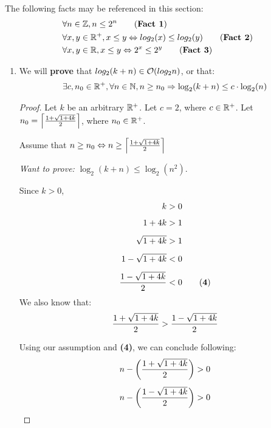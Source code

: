 \documentclass[12pt]{article}
\theoremstyle{definition}
\begin{document}
The following facts may be referenced in this section:
\begin{align*}
    &\forall n \in \Z, n \leq 2^n \tag{\textbf{Fact 1}}\\
    &\forall x, y \in \R^+, x \leq y \iff log_2(x) \leq log_2(y) \tag{\textbf{Fact 2}}\\
    &\forall x, y \in \R, x \leq y \iff 2^x \leq 2^y \tag{\textbf{Fact 3}}
\end{align*}

\begin{enumerate}

    \item We will \textbf{prove} that $log_2(k+n) \in \mathcal O(log_2 n)$, or that:
    \begin{align*}
        \exists c, n_0 \in \mathbb R^+, \forall n \in \mathbb N, n \geq n_0 \mathrel{\Rightarrow} \log_2(k+n) \leq c \cdot \log_2(n)
    \end{align*}
        \begin{proof}
            Let $k$ be an arbitrary $\mathbb R^+$. 
            Let $c = 2$, where $c \in \mathbb R^+$. 
            Let $n_0 = \left \lceil \frac{1 + \sqrt{1 + 4k}}{2} \right \rceil$, where $n_0 \in \mathbb R^+$.
            
            Assume that $n \geq n_0 \mathrel{\Leftrightarrow} n \geq \left \lceil \frac{1 + \sqrt{1 + 4k}}{2} \right \rceil$
            
            \emph{Want to prove:} $\log_2(k+n) \leq \log_2(n^2)$.
            
            Since $k > 0$,
            \begin{align*}
                k&>0\\[1ex]
                1 + 4k &> 1\\[1ex]
                \nnsq &> 1\\[1ex]
                1 - \nnsq &< 0\\[1ex]
                \nnfs &< 0\tag{\textbf{4}}
            \end{align*}
            We also know that:
            \begin{align*}
                \frac{1 + \sqrt{1 + 4k}}{2} > \frac{1 - \sqrt{1 + 4k}}{2}
            \end{align*}
            
            Using our assumption and \textbf{(4)}, we can conclude following:
            \begin{align*}
                n - \bigg(\frac{1 + \sqrt{1 + 4k}}{2}\bigg) &> 0\\[1ex]
                n - \bigg(\frac{1 - \sqrt{1 + 4k}}{2}\bigg) &> 0
            \end{align*}
            

\end{proof}
\end{enumerate}
\end{document}

